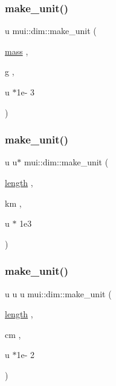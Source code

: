 \mbox{\label{namespacemui_1_1dim_a75a325dba4b8418cd26b7ba98620c6ee}} 
\subsubsection{\texorpdfstring{make\+\_\+unit()}{make\_unit()}\hspace{0.1cm}{\footnotesize\ttfamily [2/32]}}
{\footnotesize\ttfamily u mui\+::dim\+::make\+\_\+unit (\begin{DoxyParamCaption}\item[{\hyperlink{namespacemui_1_1dim_a7b17424f4316e37d7970ee09857ccddf}{mass}}]{,  }\item[{g}]{,  }\item[{u $\ast$1e-\/}]{3 }\end{DoxyParamCaption})}

\mbox{\label{namespacemui_1_1dim_a7ee1fac88aeb1c25bb5322f8cce98459}} 
\subsubsection{\texorpdfstring{make\+\_\+unit()}{make\_unit()}\hspace{0.1cm}{\footnotesize\ttfamily [3/32]}}
{\footnotesize\ttfamily u u$\ast$ mui\+::dim\+::make\+\_\+unit (\begin{DoxyParamCaption}\item[{\hyperlink{namespacemui_1_1dim_ade9a9679bc46e16322ef419974faebe6}{length}}]{,  }\item[{km}]{,  }\item[{u $\ast$}]{1e3 }\end{DoxyParamCaption})}

\mbox{\label{namespacemui_1_1dim_a0d1bd6ac4c480b2a07fa322573dbb6a7}} 
\subsubsection{\texorpdfstring{make\+\_\+unit()}{make\_unit()}\hspace{0.1cm}{\footnotesize\ttfamily [4/32]}}
{\footnotesize\ttfamily u u u mui\+::dim\+::make\+\_\+unit (\begin{DoxyParamCaption}\item[{\hyperlink{namespacemui_1_1dim_ade9a9679bc46e16322ef419974faebe6}{length}}]{,  }\item[{cm}]{,  }\item[{u $\ast$1e-\/}]{2 }\end{DoxyParamCaption})}

